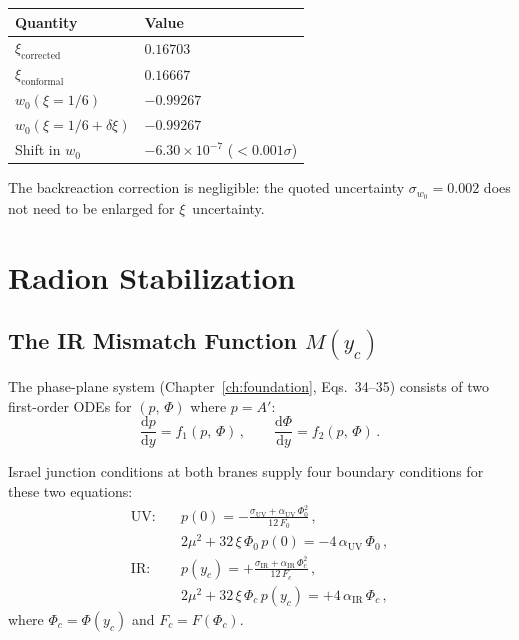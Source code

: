 \begin{center}
\begin{tabular}{l l}
\hline
Quantity & Value \\
\hline
$\xi_{\mathrm{corrected}}$ & $0.16703$ \\
$\xi_{\mathrm{conformal}}$ & $0.16667$ \\
$w_0(\xi = 1/6)$ & $-0.99267$ \\
$w_0(\xi = 1/6 + \delta\xi)$ & $-0.99267$ \\
Shift in $w_0$ & $-6.30 \times 10^{-7}$ ($< 0.001\sigma$) \\
\hline
\end{tabular}
\end{center}

\noindent
The backreaction correction is negligible: the quoted uncertainty $\sigma_{w_0} = 0.002$ does not need to be enlarged for $\xi$~uncertainty.


\section{Radion Stabilization}
\label{app:radion}

\subsection{The IR Mismatch Function $M(y_c)$}

The phase-plane system (Chapter~\ref{ch:foundation}, Eqs.~34--35) consists of two first-order ODEs for $(p,\,\Phi)$ where $p = A'$:
\begin{equation}
  \frac{\mathrm{d}p}{\mathrm{d}y} = f_1(p,\,\Phi)\,,\qquad
  \frac{\mathrm{d}\Phi}{\mathrm{d}y} = f_2(p,\,\Phi)\,.
\end{equation}

Israel junction conditions at both branes supply four boundary conditions for these two equations:
\begin{align}
  \text{UV:}\quad
    & p(0) = -\frac{\sigma_{\mathrm{UV}} + \alpha_{\mathrm{UV}}\,\Phi_0^2}{12\,F_0}\,,
    \label{eq:bc-uv1} \\[3pt]
    & 2\mu^2 + 32\,\xi\,\Phi_0\,p(0) = -4\,\alpha_{\mathrm{UV}}\,\Phi_0\,,
    \label{eq:bc-uv2} \\[6pt]
  \text{IR:}\quad
    & p(y_c) = +\frac{\sigma_{\mathrm{IR}} + \alpha_{\mathrm{IR}}\,\Phi_c^2}{12\,F_c}\,,
    \label{eq:bc-ir1} \\[3pt]
    & 2\mu^2 + 32\,\xi\,\Phi_c\,p(y_c) = +4\,\alpha_{\mathrm{IR}}\,\Phi_c\,,
    \label{eq:bc-ir2}
\end{align}
where $\Phi_c = \Phi(y_c)$ and $F_c = F(\Phi_c)$.


